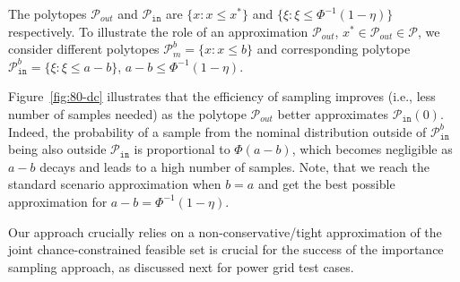 The polytopes $\mathcal{P}_{out}$ and $\mathcal{P}_{\texttt{in}}$ are $\{x: x\le x^*\}$ and $\{\xi: \xi \leq \Phi^{-1}(1-\eta)\}$ respectively. To illustrate the role of an approximation $\mathcal{P}_{out}$, $x^* \in \mathcal{P}_{out} \in \mathcal{P}$, we consider different polytopes $\mathcal{P}^b_{m} = \{x: x\le b\}$ and corresponding polytope $\mathcal{P}_{\texttt{in}}^b = \{\xi: \xi \leq a - b\}$, $a - b \le \Phi^{-1}(1-\eta)$.  

Figure~\ref{fig:80-dc} illustrates that the efficiency of sampling improves (i.e., less number of samples needed) as the polytope $\mathcal{P}_{out}$ better approximates $\mathcal{P}_{\texttt{in}}(0)$. Indeed, the probability of a sample from the nominal distribution outside of $\mathcal{P}_{\texttt{in}}^b$ being also outside $\mathcal{P}_{\texttt{in}}$ is proportional to $\Phi(a-b)$, which becomes negligible as $a-b$ decays and leads to a high number of samples. Note, that we reach the standard scenario approximation when $b = a$ and get the best possible approximation for $a-b = \Phi^{-1}(1-\eta)$. 



Our approach crucially relies on a non-conservative/tight approximation of the joint chance-constrained feasible set is crucial for the success of the importance sampling approach, as discussed next for power grid test cases. 

